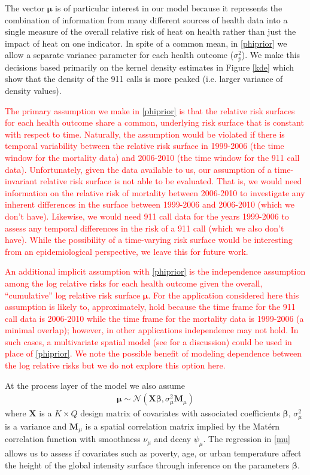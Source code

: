 \documentclass[final]{statsoc}
\begin{document}
The vector $\boldsymbol\mu$ is of particular interest in our model because it represents
the combination of information from many different sources of health data into
a single measure of the overall relative risk of heat on 
health rather than just the impact of heat on one indicator. In spite of a common mean, 
in \eqref{phiprior} we allow a separate variance parameter for each health outcome 
($\sigma^2_p$). We make this decisions based primarily on the kernel density estimates 
in Figure \ref{kde} which 
show that the density of the 911 calls is more peaked (i.e. larger variance of density values).

\textcolor{red}{The primary assumption we make in \eqref{phiprior} is that the relative risk surfaces for each health outcome share a common, underlying risk surface that is constant with respect to time. Naturally, the assumption would be violated if there is temporal variability between the relative risk surface in 1999-2006 (the time window for the mortality data) and 2006-2010 (the time window for the 911 call data). Unfortunately, given the data available to us, our assumption of a time-invariant relative risk surface is not able to be evaluated. That is, we would need information on the relative risk of mortality between 2006-2010 to investigate any inherent differences in the surface between 1999-2006 and 2006-2010 (which we don't have). Likewise, we would need 911 call data for the years 1999-2006 to assess any temporal differences in the risk of a 911 call (which we also don't have). While the possibility of a time-varying risk surface would be interesting from an epidemiological perspective, we leave this for future work.}

\textcolor{red}{An additional implicit assumption with \eqref{phiprior} is the independence assumption among the log relative risks for each health outcome given the overall, ``cumulative'' log relative risk surface $\boldsymbol{\mu}$. For the application considered here this assumption is likely to, approximately, hold because the time frame for the 911 call data is 2006-2010 while the time frame for the mortality data is 1999-2006 (a minimal overlap); however, in other applications independence may not hold. In such cases, a multivariate spatial model (see \cite{Genton2015} for a discussion) could be used in place of \eqref{phiprior}. We note the possible benefit of modeling dependence between the log relative risks but we do not explore this option here.}


At the process layer of the model we also assume 
\begin{align}
\boldsymbol{\mu} \sim \mathcal{N}(\mathbf{X}\boldsymbol{\beta},\sigma^2_\mu\mathbf{M}_\mu)
\label{mu}
\end{align}
where $\mathbf{X}$ is a $K\times Q$ design matrix of covariates with associated coefficients 
$\boldsymbol{\beta}$, $\sigma^2_\mu$ is a variance and $\mathbf{M}_\mu$ is a spatial correlation 
matrix implied by the Mat\'{e}rn correlation function with smoothness $\nu_\mu$ and 
decay $\psi_\mu$. The regression in \eqref{mu} allows us to assess if covariates such as 
poverty, age, or urban temperature affect the height of the global intensity surface 
through inference on the parameters $\boldsymbol{\beta}$.
\end{document}
